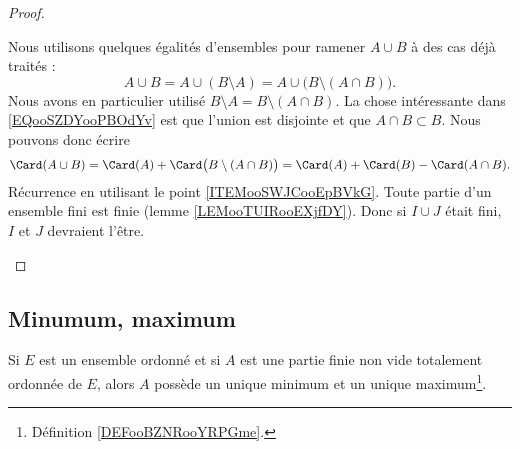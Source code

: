 \begin{proof}
\begin{subproof}
		Nous utilisons quelques égalités d'ensembles pour ramener \( A\cup B\) à des cas déjà traités :
		\begin{equation}        \label{EQooSZDYooPBOdYv}
			A\cup B=A\cup(B\setminus A)=A\cup\big( B\setminus(A\cap B) \big).
		\end{equation}
		Nous avons en particulier utilisé \( B\setminus A=B\setminus(A\cap B)\). La chose intéressante dans \eqref{EQooSZDYooPBOdYv} est que l'union est disjointe et que \( A\cap B\subset B\). Nous pouvons donc écrire
		\begin{equation}
			\Card(A\cup B)=\Card(A)+\Card\big( B\setminus(A\cap B) \big)=\Card(A)+\Card(B)-\Card(A\cap B).
		\end{equation}
		Récurrence en utilisant le point \ref{ITEMooSWJCooEpBVkG}.
		Toute partie d'un ensemble fini est finie (lemme \ref{LEMooTUIRooEXjfDY}). Donc si \( I\cup J\) était fini, \( I\) et \( J\) devraient l'être.
	\end{subproof}
\end{proof}


\subsection{Minumum, maximum}


\begin{lemma}       \label{LEMooPCRFooXRGrUr}
	Si \( E\) est un ensemble ordonné et si \( A\) est une partie finie non vide totalement ordonnée de \( E\), alors \( A\) possède un unique minimum et un unique maximum\footnote{Définition \ref{DEFooBZNRooYRPGme}.}.
\end{lemma}

